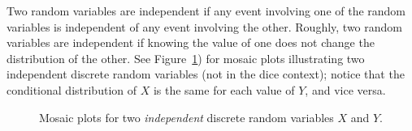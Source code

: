 \documentclass[
  letterpaper,
  DIV=11,
  numbers=noendperiod]{scrreprt}
\theoremstyle{plain}
\theoremstyle{definition}
\theoremstyle{definition}
\theoremstyle{definition}
\theoremstyle{remark}
\begin{document}
Two random variables are independent if any event involving one of the
random variables is independent of any event involving the other.
Roughly, two random variables are independent if knowing the value of
one does not change the distribution of the other. See
Figure~\ref{fig-independent-rv-mosaic}) for mosaic plots illustrating
two independent discrete random variables (not in the dice context);
notice that the conditional distribution of \(X\) is the same for each
value of \(Y\), and vice versa.

\begin{figure}

\begin{minipage}{0.50\linewidth}



\end{minipage}%
%
\begin{minipage}{0.50\linewidth}



\end{minipage}%

\caption{\label{fig-independent-rv-mosaic}Mosaic plots for two
\emph{independent} discrete random variables \(X\) and \(Y\).}

\end{figure}%
\end{document}
